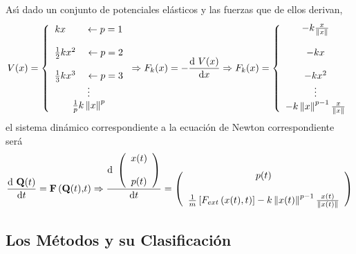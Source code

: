 \documentclass[spanish,titlepage,11pt]{article}
\begin{document}
As\'{\i} dado un conjunto de potenciales el\'{a}sticos y las fuerzas que de
ellos derivan,
\[
V(x)=\left\{
\begin{array}
[c]{c}%
kx\quad\quad\leftarrow p=1\\
\\
\frac{1}{2}kx^{2}\quad\leftarrow p=2\\
\\
\frac{1}{3}kx^{3}\quad\leftarrow p=3\\
\vdots\\
\frac{1}{p}k\left\|  x\right\|  ^{p}%
\end{array}
\right.  \Rightarrow F_{k}(x)=-\frac{\mathrm{d\ }V\mathbf{(}x\mathbf{)}%
}{\mathrm{d}x}\Rightarrow F_{k}(x)=\left\{
\begin{array}
[c]{c}%
-k\frac{x}{\left\|  x\right\|  }\\
\\
-kx\\
\\
-kx^{2}\\
\vdots\\
-k\left\|  x\right\|  ^{p-1}\frac{x}{\left\|  x\right\|  }%
\end{array}
\right.
\]
el sistema din\'{a}mico correspondiente a la ecuaci\'{o}n de Newton
correspondiente ser\'{a}
\[
\frac{\mathrm{d\ }\mathbf{Q(}t\mathbf{)}}{\mathrm{d}t}=\mathbf{F}\left(
\mathbf{Q(}t\mathbf{),}t\right)  \Rightarrow\frac{\mathrm{d\ }\left(
\begin{array}
[c]{c}%
x(t)\\
\\
p(t)
\end{array}
\right)  }{\mathrm{d}t}=\left(
\begin{array}
[c]{c}%
p(t)\\
\\
\frac{1}{m}\left[  F_{ext}\left(  x(t),t\right)  \right]  -k\left\|
x(t)\right\|  ^{p-1}\frac{x(t)}{\left\|  x(t)\right\|  }%
\end{array}
\right)
\]

\subsection{Los M\'{e}todos y su Clasificaci\'{o}n}
\end{document}
